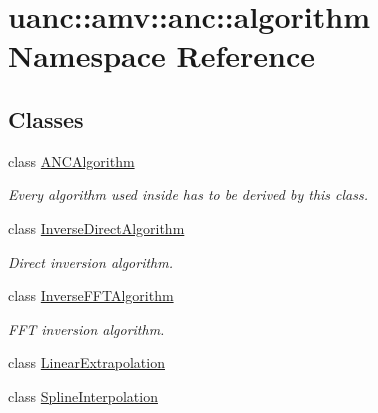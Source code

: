 \hypertarget{namespaceuanc_1_1amv_1_1anc_1_1algorithm}{}\section{uanc\+:\+:amv\+:\+:anc\+:\+:algorithm Namespace Reference}
\label{namespaceuanc_1_1amv_1_1anc_1_1algorithm}
\subsection*{Classes}
\begin{DoxyCompactItemize}
\item 
class \hyperlink{classuanc_1_1amv_1_1anc_1_1algorithm_1_1_a_n_c_algorithm}{A\+N\+C\+Algorithm}
\begin{DoxyCompactList}\small\item\em Every algorithm used inside has to be derived by this class. \end{DoxyCompactList}\item 
class \hyperlink{classuanc_1_1amv_1_1anc_1_1algorithm_1_1_inverse_direct_algorithm}{Inverse\+Direct\+Algorithm}
\begin{DoxyCompactList}\small\item\em Direct inversion algorithm. \end{DoxyCompactList}\item 
class \hyperlink{classuanc_1_1amv_1_1anc_1_1algorithm_1_1_inverse_f_f_t_algorithm}{Inverse\+F\+F\+T\+Algorithm}
\begin{DoxyCompactList}\small\item\em F\+FT inversion algorithm. \end{DoxyCompactList}\item 
class \hyperlink{classuanc_1_1amv_1_1anc_1_1algorithm_1_1_linear_extrapolation}{Linear\+Extrapolation}
\item 
class \hyperlink{classuanc_1_1amv_1_1anc_1_1algorithm_1_1_spline_interpolation}{Spline\+Interpolation}
\end{DoxyCompactItemize}
